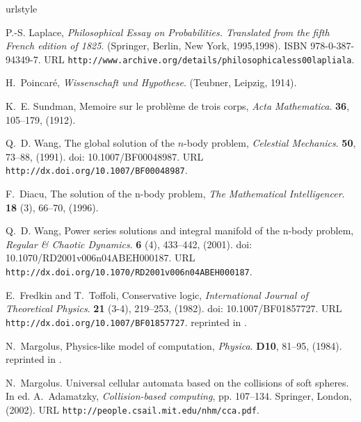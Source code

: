 \documentclass{ws-rv9x6}
\begin{document}
\begin{thebibliography}{25}
\providecommand{\natexlab}[1]{#1}
\providecommand{\url}[1]{\texttt{#1}}
\expandafter\ifx\csname urlstyle\endcsname\relax
  \providecommand{\doi}[1]{doi: #1}\else
  \providecommand{\doi}{doi: \begingroup \urlstyle{rm}\Url}\fi

P.-S. Laplace, \emph{Philosophical Essay on Probabilities. {T}ranslated from
  the fifth {F}rench edition of 1825}. (Springer, Berlin, New York, 1995,1998).
\newblock ISBN 978-0-387-94349-7.
\newblock URL \url{http://www.archive.org/details/philosophicaless00lapliala}.

H.~Poincar{\'{e}}, \emph{Wissenschaft und Hypothese}. (Teubner, Leipzig, 1914).

K.~E. Sundman, Memoire sur le probl{\`{e}}me de trois corps, \emph{Acta
  Mathematica}. {\bf 36},  105--179,  (1912).

Q.~D. Wang, The global solution of the $n$-body problem, \emph{Celestial
  Mechanics}. {\bf 50},  73--88,  (1991).
\newblock \doi{10.1007/BF00048987}.
\newblock URL \url{http://dx.doi.org/10.1007/BF00048987}.

F.~Diacu, The solution of the n-body problem, \emph{The Mathematical
  Intelligencer}. {\bf 18} (3),  66--70,  (1996).

Q.~D. Wang, Power series solutions and integral manifold of the n-body problem,
  \emph{Regular \& Chaotic Dynamics}. {\bf 6} (4),  433--442,
   (2001).
\newblock \doi{10.1070/RD2001v006n04ABEH000187}.
\newblock URL \url{http://dx.doi.org/10.1070/RD2001v006n04ABEH000187}.

E.~Fredkin and T.~Toffoli, Conservative logic, \emph{International Journal of
  Theoretical Physics}. {\bf 21} (3-4),  219--253,  (1982).
\newblock \doi{10.1007/BF01857727}.
\newblock URL \url{http://dx.doi.org/10.1007/BF01857727}.
\newblock reprinted in \cite[Part I, Chapter 3]{adama02}.

N.~Margolus, Physics-like model of computation, \emph{Physica}. {\bf D10},
   81--95,  (1984).
\newblock reprinted in \cite[Part I, Chapter 4]{adama02}.

N.~Margolus.
\newblock Universal cellular automata based on the collisions of soft spheres.
\newblock In ed. A.~Adamatzky, \emph{Collision-based computing}, pp. 107--134.
  Springer, London,  (2002).
\newblock URL \url{http://people.csail.mit.edu/nhm/cca.pdf}.


\end{thebibliography}
\end{document}
